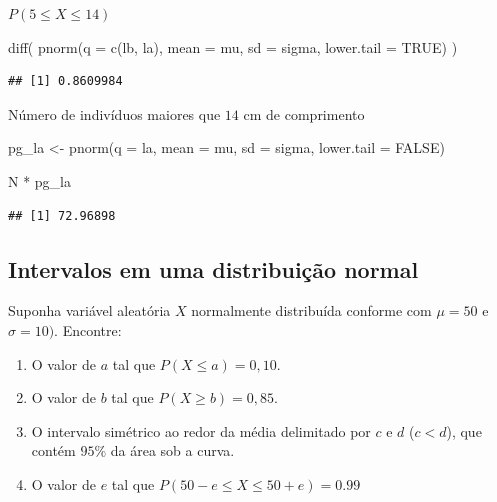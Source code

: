 \documentclass[
]{book}
\newenvironment{Shaded}{\begin{snugshade}}{\end{snugshade}}
\newcommand{\AttributeTok}[1]{\textcolor[rgb]{0.77,0.63,0.00}{#1}}
\newcommand{\ConstantTok}[1]{\textcolor[rgb]{0.00,0.00,0.00}{#1}}
\newcommand{\FunctionTok}[1]{\textcolor[rgb]{0.00,0.00,0.00}{#1}}
\newcommand{\NormalTok}[1]{#1}
\newcommand{\OtherTok}[1]{\textcolor[rgb]{0.56,0.35,0.01}{#1}}
\newcommand{\SpecialCharTok}[1]{\textcolor[rgb]{0.00,0.00,0.00}{#1}}
\providecommand{\tightlist}{%
  \setlength{\itemsep}{0pt}\setlength{\parskip}{0pt}}
\begin{document}
\(P(5 \le X \le 14)\)

\begin{Shaded}
\begin{Highlighting}[]
\FunctionTok{diff}\NormalTok{(}
   \FunctionTok{pnorm}\NormalTok{(}\AttributeTok{q =} \FunctionTok{c}\NormalTok{(lb, la),}
         \AttributeTok{mean =}\NormalTok{ mu,}
         \AttributeTok{sd =}\NormalTok{ sigma,}
         \AttributeTok{lower.tail =} \ConstantTok{TRUE}\NormalTok{)}
\NormalTok{   )}
\end{Highlighting}
\end{Shaded}

\begin{verbatim}
## [1] 0.8609984
\end{verbatim}

Número de indivíduos maiores que \(14\) cm de comprimento

\begin{Shaded}
\begin{Highlighting}[]
\NormalTok{pg\_la }\OtherTok{\textless{}{-}} \FunctionTok{pnorm}\NormalTok{(}\AttributeTok{q =}\NormalTok{ la, }\AttributeTok{mean =}\NormalTok{ mu, }\AttributeTok{sd =}\NormalTok{ sigma, }\AttributeTok{lower.tail =} \ConstantTok{FALSE}\NormalTok{)}

\NormalTok{N }\SpecialCharTok{*}\NormalTok{ pg\_la}
\end{Highlighting}
\end{Shaded}

\begin{verbatim}
## [1] 72.96898
\end{verbatim}

\hypertarget{intervalos-em-uma-distribuiuxe7uxe3o-normal}{%
\subsection{Intervalos em uma distribuição normal}\label{intervalos-em-uma-distribuiuxe7uxe3o-normal}}

Suponha variável aleatória \(X\) normalmente distribuída conforme com \(\mu = 50\) e \(\sigma = 10)\). Encontre:

\begin{enumerate}
\def\labelenumi{\roman{enumi}.}
\tightlist
\item
  O valor de \(a\) tal que \(P(X \le a) = 0,10\).
\item
  O valor de \(b\) tal que \(P(X \ge b) = 0,85\).
\item
  O intervalo simétrico ao redor da média delimitado por \(c\) e \(d\) (\(c < d\)), que contém \(95\%\) da área sob a curva.
\item
  O valor de \(e\) tal que \(P(50-e \le X \le 50+e) = 0.99\)
\end{enumerate}
\end{document}
